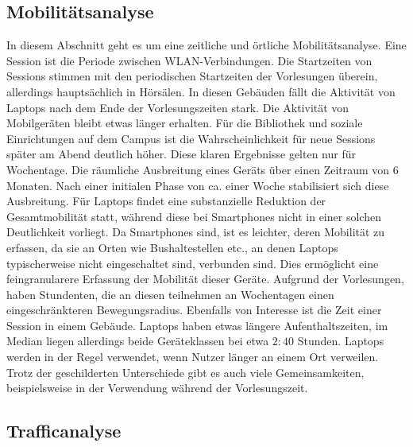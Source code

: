 \documentclass[12pt, a4paper]{article}
\begin{document}
\subsection{Mobilitätsanalyse}

In diesem Abschnitt geht es um eine zeitliche und örtliche Mobilitätsanalyse.
\newline\newline
Eine Session ist die Periode zwischen WLAN-Verbindungen. Die Startzeiten von Sessions stimmen mit den periodischen Startzeiten 
der Vorlesungen überein, allerdings hauptsächlich in Hörsälen. In diesen Gebäuden fällt die Aktivität von Laptops nach dem Ende
der Vorlesungszeiten stark. Die Aktivität von Mobilgeräten bleibt etwas länger erhalten. Für die Bibliothek und soziale
Einrichtungen auf dem Campus ist die Wahrscheinlichkeit für neue Sessions später am Abend deutlich höher. Diese klaren 
Ergebnisse gelten nur für Wochentage.
\newline\newline
Die räumliche Ausbreitung eines Geräts über einen Zeitraum von 6 Monaten.
Nach einer initialen Phase von ca. einer Woche stabilisiert sich diese Ausbreitung. Für Laptops
findet eine substanzielle Reduktion der Gesamtmobilität statt, während diese bei Smartphones nicht
in einer solchen Deutlichkeit vorliegt.
Da Smartphones  sind, ist es leichter, deren Mobilität zu erfassen, da sie an Orten
wie Bushaltestellen etc., an denen Laptops typischerweise nicht eingeschaltet sind, verbunden sind.
Dies ermöglicht eine feingranularere Erfassung der Mobilität dieser Geräte.
Aufgrund der Vorlesungen, haben Stundenten, die an diesen teilnehmen an Wochentagen einen eingeschränkteren Bewegungsradius.
\newline\newline
Ebenfalls von Interesse ist die Zeit einer Session in einem Gebäude.
Laptops haben etwas längere Aufenthaltszeiten, im Median liegen allerdings beide Geräteklassen bei etwa $2:40$ Stunden.
Laptops werden in der Regel verwendet, wenn Nutzer länger an einem Ort verweilen.
\newline\newline
Trotz der geschilderten Unterschiede gibt es auch viele Gemeinsamkeiten, beispielsweise in der Verwendung während der Vorlesungszeit.

\subsection{Trafficanalyse}
\end{document}

